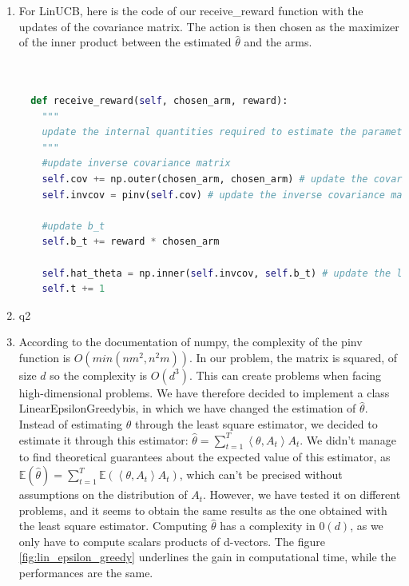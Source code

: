 \begin{enumerate}
    \item For LinUCB, here is the code of our receive\_reward function with the updates of the covariance matrix. The action is then chosen as the maximizer of the inner product between the estimated $\hat{\theta}$ and the arms.

    \begin{lstlisting}[language=Python]

        
  def receive_reward(self, chosen_arm, reward):
    """
    update the internal quantities required to estimate the parameter theta using least squares
    """
    #update inverse covariance matrix
    self.cov += np.outer(chosen_arm, chosen_arm) # update the covariance matrix
    self.invcov = pinv(self.cov) # update the inverse covariance matrix

    #update b_t
    self.b_t += reward * chosen_arm

    self.hat_theta = np.inner(self.invcov, self.b_t) # update the least square estimate
    self.t += 1
    \end{lstlisting}


        
    \item q2
    \item According to the documentation of numpy, the complexity of the pinv function is $O(min(n m^2, n^2m))$. In our problem, the matrix is squared, of size $d$ so the complexity is $O(d^3)$.
This can create problems when facing high-dimensional problems. We have therefore decided to implement a class LinearEpsilonGreedybis, in which we have changed the estimation of $\hat{\theta}$. 
Instead of estimating $\theta$ through the least square estimator, we decided to estimate it through this estimator: $\hat{\theta} = \sum_{t=1}^{T} \left\langle \theta , A_t\right\rangle A_t$. 
We didn't manage to find theoretical guarantees about the expected value of this estimator, as $\mathbb{E}(\hat{\theta}) = \sum_{t=1}^{T} \mathbb{E} ( \left\langle \theta , A_t\right\rangle A_t) $, which can't be precised without assumptions on the distribution of $A_t$.
However, we have tested it on different problems, and it seems to obtain the same results as the one obtained with the least square estimator.
Computing $\hat{\theta}$ has a complexity in $0(d)$, as we only have to compute scalars products of d-vectors. The figure \ref{fig:lin_epsilon_greedy} underlines the gain in computational time, while the performances are the same.


\end{enumerate}

